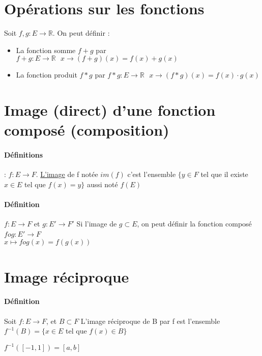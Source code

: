 \section{Opérations sur les fonctions}
Soit $f, g : E \rightarrow \mathbb{R}$. On peut définir :

\begin{itemize}
	\item La fonction somme $f+g$ par $f+g : E \rightarrow \mathbb{R} \text{ }
		x\rightarrow(f+g)(x) = f(x)+g(x)$
	\item La fonction produit $f*g$ par $f*g : E \rightarrow \mathbb{R} \text{ }
		x\rightarrow(f*g)(x) = f(x) \cdot g(x)$
\end{itemize}

\section{Image (direct) d'une fonction composé (composition)}
\paragraph{Définitions} : $f:E \rightarrow F$. \ul{L'image} de f notée $im(f)$ c'est l'ensemble $\{y \in F$ tel que il existe $x \in E$ tel que $f(x) = y\}$ aussi noté $f(E)$

\paragraph{Définition} $f:E \rightarrow F$ et $g:E' \rightarrow F'$
Si l'image de $g \subset E$, on peut définir la fonction composé $f o g : E' \rightarrow F$ 
~\\
$x \mapsto f o g (x) = f(g(x))$

\section{Image réciproque} 
\paragraph{Définition} Soit $f:E \rightarrow F$, et $B \subset F$ L'image réciproque de B par f est l'ensemble  $f^{-1}(B) = \{x \in E$ tel que $f(x) \in B\}$

$f^{-1}([-1, 1]) = [a, b]$
